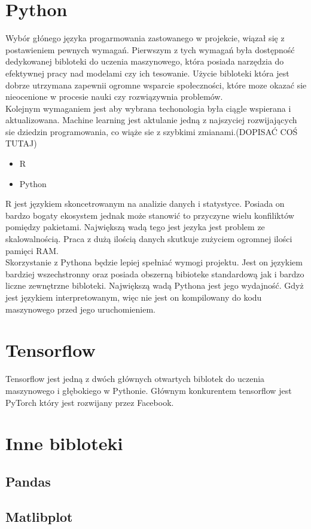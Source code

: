 \documentclass[a4paper,twoside,12pt]{book}
\begin{document}
\section{Python}
Wybór głónego języka progarmowania zastowanego w projekcie, wiązał się z postawieniem pewnych wymagań. Pierwszym z tych wymagań była dostępność dedykowanej bibloteki do uczenia maszynowego, która posiada narzędzia do efektywnej pracy nad modelami czy ich tesowanie. Użycie bibloteki która jest dobrze utrzymana zapewnii ogromne wsparcie społeczności, które moze okazać sie nieocenione w procesie nauki czy rozwiązywnia problemów.\\Kolejnym wymaganiem jest aby wybrana techonologia była ciągle wspierana i aktualizowana. Machine learning jest aktulanie jedną z najszyciej rozwijających sie dziedzin programowania, co wiąże sie z szybkimi zmianami.(DOPISAĆ COŚ TUTAJ)
\begin{itemize}
	\item R
	\item Python
\end{itemize}

R jest językiem skoncetrowanym na analizie danych i statystyce. Posiada on bardzo bogaty ekosystem jednak może stanowić to przyczyne wielu konfiliktów pomiędzy pakietami. Największą wadą tego jest jezyka jest problem ze skalowalnością. Praca z dużą ilością danych skutkuje zużyciem ogromnej ilości pamięci RAM.\\ Skorzystanie z Pythona będzie lepiej spełniać wymogi projektu. Jest on językiem bardziej wszechstronny oraz posiada obszerną bibioteke standardową jak i bardzo liczne zewnętrzne bibloteki. Największą wadą Pythona jest jego wydajność. Gdyż jest językiem interpretowanym, więc nie jest on kompilowany do kodu maszynowego przed jego uruchomieniem.
\section{Tensorflow}
Tensorflow jest jedną z dwóch głównych otwartych biblotek do uczenia maszynowego i głębokiego w Pythonie. Głównym konkurentem tensorflow jest PyTorch który jest rozwijany przez Facebook.
\section{Inne bibloteki}
\subsection{Pandas}
\subsection{Matlibplot}
\end{document}
